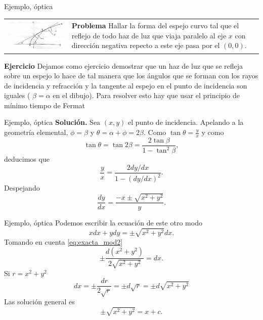 \documentclass[handout,hyperref={colorlinks=true}]{beamer}
\newcommand{\nl}{\onslide<+-> }
\begin{document}
\begin{frame}{Ejemplo, óptica}
\nl\begin{tabular}{m{5cm} m{4.5cm} }
\includegraphics[scale=.4]{imagenes/espejo.png} & \textbf{Problema} Hallar la forma del espejo curvo tal que el reflejo de todo haz de luz que viaja paralelo al eje $x$ con dirección
negativa repecto a este eje pasa por el $(0,0)$. \\
\end{tabular}
\nl \textbf{Ejercicio} Dejamos como ejercicio demostrar que un haz de luz que se refleja sobre un espejo lo hace de tal manera que los ángulos que se forman con los rayos 
de incidencia y refracción y la tangente al espejo en el punto de incidencia son iguales ( $\beta=\alpha$ en el dibujo). Para resolver esto hay que usar el principio
de mínimo tiempo de Fermat


\end{frame}


\begin{frame}{Ejemplo, óptica}
 \textbf{Solución.} Sea $(x,y)$ el punto de incidencia. Apelando a la geometría elemental, $\phi=\beta$ y $\theta=\alpha+\phi=2\beta$. Como $\tan\theta=\frac{y}{x}$
  y como
  \[\tan\theta =\tan 2\beta=\frac{2\tan\beta}{1-\tan^2\beta},\]
deducimos que
\[\frac{y}{x}=\frac{2 dy/dx}{1-(dy/dx)^2}.\]
Despejando
\[\frac{dy}{dx} =\frac{-x\pm\sqrt{x^2+y^2}}{y}.\]

\end{frame}


\begin{frame}{Ejemplo, óptica}
Podemos escribir la ecuación de este otro modo
\[xdx+ydy=\pm\sqrt{x^2+y^2}dx.\]
Tomando en cuenta \eqref{eq:exacta_mod2}
\[\pm\frac{d(x^2+y^2)}{2\sqrt{x^2+y^2}}=dx.\]
Si $r=x^2+y^2$
\[dx=\pm\frac{dr}{2\sqrt{r}}=\pm d\sqrt{r}=\pm d\sqrt{x^2+y^2}\]
Las solución general es
\[\pm\sqrt{x^2+y^2}=x+c.\]
 


\end{frame}
\end{document}
